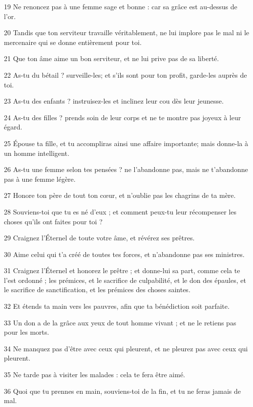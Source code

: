 \par 19 Ne renoncez pas à une femme sage et bonne : car sa grâce est au-dessus de l'or.
\par 20 Tandis que ton serviteur travaille véritablement, ne lui implore pas le mal ni le mercenaire qui se donne entièrement pour toi.
\par 21 Que ton âme aime un bon serviteur, et ne lui prive pas de sa liberté.
\par 22 As-tu du bétail ? surveille-les; et s'ils sont pour ton profit, garde-les auprès de toi.
\par 23 As-tu des enfants ? instruisez-les et inclinez leur cou dès leur jeunesse.
\par 24 As-tu des filles ? prends soin de leur corps et ne te montre pas joyeux à leur égard.
\par 25 Épouse ta fille, et tu accompliras ainsi une affaire importante; mais donne-la à un homme intelligent.
\par 26 As-tu une femme selon tes pensées ? ne l'abandonne pas, mais ne t'abandonne pas à une femme légère.
\par 27 Honore ton père de tout ton cœur, et n'oublie pas les chagrins de ta mère.
\par 28 Souviens-toi que tu es né d'eux ; et comment peux-tu leur récompenser les choses qu'ils ont faites pour toi ?
\par 29 Craignez l'Éternel de toute votre âme, et révérez ses prêtres.
\par 30 Aime celui qui t'a créé de toutes tes forces, et n'abandonne pas ses ministres.
\par 31 Craignez l'Éternel et honorez le prêtre ; et donne-lui sa part, comme cela te l'est ordonné ; les prémices, et le sacrifice de culpabilité, et le don des épaules, et le sacrifice de sanctification, et les prémices des choses saintes.
\par 32 Et étends ta main vers les pauvres, afin que ta bénédiction soit parfaite.
\par 33 Un don a de la grâce aux yeux de tout homme vivant ; et ne le retiens pas pour les morts.
\par 34 Ne manquez pas d'être avec ceux qui pleurent, et ne pleurez pas avec ceux qui pleurent.
\par 35 Ne tarde pas à visiter les malades : cela te fera être aimé.
\par 36 Quoi que tu prennes en main, souviens-toi de la fin, et tu ne feras jamais de mal.


